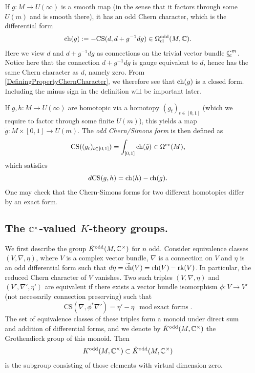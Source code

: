 \documentclass[10pt]{amsart}
\begin{document}
\medskip



If $g : M \to U(\infty)$ is a smooth map (in the sense that it factors through some $U(m)$ and is smooth there), it has an odd Chern character, which is the differential form
\[
\mathrm{ch}(g) := -\mathrm{CS}(d, d+g^{-1}dg) \in \Omega^{\mathrm{odd}}_{\mathrm{cl}}(M, \mathbb{C}).
\]
Here we view $d$ and $d+ g^{-1}dg$ as connections on the trivial vector bundle $\underline{\mathbb{C}}^m$. Notice here that the connection $d+ g^{-1}dg$ is gauge equivalent to $d$, hence has the same Chern character as $d$, namely zero. From \cref{DefiningPropertyChernCharacter}, we therefore see that $\mathrm{ch}(g)$ is a closed form. Including the minus sign in the definition will be important later.

If $g, h : M \to U(\infty)$ are homotopic via a homotopy $(g_t)_{t \in [0, 1]}$ (which we require to factor through some finite $U(m)$), this yields a map $\tilde{g} : M \times [0, 1] \to U(m)$. The \emph{odd Chern/Simons form} is then defined as
\[
\mathrm{CS}((g_t)_{t \in [0, 1]}) = \int_{[0, 1]} \mathrm{ch}(\tilde{g}) \in \Omega^{\mathrm{ev}}(M),
\]
which satisfies
\[
d \mathrm{CS}(g, h) = \mathrm{ch}(h) - \mathrm{ch}(g).
\]
One may check that the Chern-Simons forms for two different homotopies differ by an exact form.
%



\subsection{The \texorpdfstring{$\mathbb{C}^\times$}{C}-valued \texorpdfstring{$K$}{K}-theory groups.}
We first describe the group $\tilde{K}^{\mathrm{odd}}(M, \mathbb{C}^\times)$ for $n$ odd. Consider equivalence classes $(V, \nabla, \eta)$, where $V$ is a complex vector bundle, $\nabla$ is a connection on $V$ and $\eta$ is an odd differential form such that $d\eta = \smash{\widetilde{\mathrm{ch}}}(V) = \mathrm{ch}(V) - \mathrm{rk}(V)$. In particular, the reduced Chern character of $V$ vanishes. Two such triples $(V, \nabla, \eta)$ and $(V', \nabla', \eta')$ are equivalent if there exists a vector bundle isomorphism $\phi : V \to V'$ (not necessarily connection preserving) such that
\[
\mathrm{CS}(\nabla, \phi^*\nabla') = \eta' - \eta \mod \text{exact forms}.
\]
The set of equivalence classes of these triples form a monoid under direct sum and addition of differential forms, and we denote by $\tilde{K}^{\mathrm{odd}}(M, \mathbb{C}^\times)$ the Grothendieck group of this monoid. Then
\[
K^{\mathrm{odd}}(M, \mathbb{C}^\times) \subset \tilde{K}^{\mathrm{odd}}(M, \mathbb{C}^\times)
\] 
is the subgroup consisting of those elements with virtual dimension zero.
\end{document}
